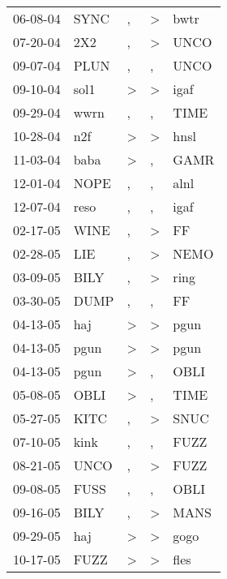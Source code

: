 \begin{supertabular}{lllll}
 06-08-04 &   SYNC &                , &     \textgreater &   bwtr \\
 07-20-04 &    2X2 &                , &     \textgreater &   UNCO \\
 09-07-04 &   PLUN &                , &                , &   UNCO \\
 09-10-04 &   sol1 &     \textgreater &     \textgreater &   igaf \\
 09-29-04 &   wwrn &                , &                , &   TIME \\
 10-28-04 &    n2f &     \textgreater &     \textgreater &   hnsl \\
 11-03-04 &   baba &     \textgreater &                , &   GAMR \\
 12-01-04 &   NOPE &                , &                , &   alnl \\
 12-07-04 &   reso &                , &                , &   igaf \\
 02-17-05 &   WINE &                , &     \textgreater &     FF \\
 02-28-05 &    LIE &                , &     \textgreater &   NEMO \\
 03-09-05 &   BILY &                , &     \textgreater &   ring \\
 03-30-05 &   DUMP &                , &                , &     FF \\
 04-13-05 &    haj &     \textgreater &     \textgreater &   pgun \\
 04-13-05 &   pgun &     \textgreater &     \textgreater &   pgun \\
 04-13-05 &   pgun &     \textgreater &                , &   OBLI \\
 05-08-05 &   OBLI &     \textgreater &                , &   TIME \\
 05-27-05 &   KITC &                , &     \textgreater &   SNUC \\
 07-10-05 &   kink &                , &                , &   FUZZ \\
 08-21-05 &   UNCO &                , &     \textgreater &   FUZZ \\
 09-08-05 &   FUSS &                , &                , &   OBLI \\
 09-16-05 &   BILY &                , &     \textgreater &   MANS \\
 09-29-05 &    haj &     \textgreater &     \textgreater &   gogo \\
 10-17-05 &   FUZZ &     \textgreater &     \textgreater &   fles \\

\end{supertabular}
